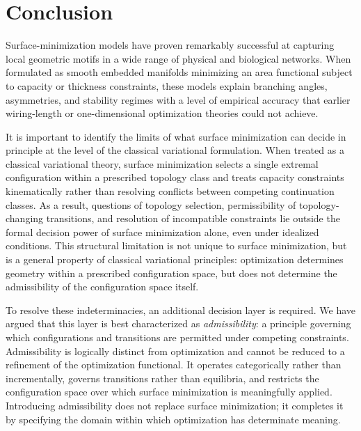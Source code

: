 \section{Conclusion}

Surface-minimization models have proven remarkably successful at capturing local geometric motifs in a wide range of physical and biological networks. When formulated as smooth embedded manifolds minimizing an area functional subject to capacity or thickness constraints, these models explain branching angles, asymmetries, and stability regimes with a level of empirical accuracy that earlier wiring-length or one-dimensional optimization theories could not achieve.\cite{Meng2026SurfaceOptimization}

It is important to identify the limits of what surface minimization can decide in principle at the level of the classical variational formulation. When treated as a classical variational theory, surface minimization selects a single extremal configuration within a prescribed topology class and treats capacity constraints kinematically rather than resolving conflicts between competing continuation classes. As a result, questions of topology selection, permissibility of topology-changing transitions, and resolution of incompatible constraints lie outside the formal decision power of surface minimization alone, even under idealized conditions. This structural limitation is not unique to surface minimization, but is a general property of classical variational principles: optimization determines geometry within a prescribed configuration space, but does not determine the admissibility of the configuration space itself.

To resolve these indeterminacies, an additional decision layer is required. We have argued that this layer is best characterized as \emph{admissibility}: a principle governing which configurations and transitions are permitted under competing constraints. Admissibility is logically distinct from optimization and cannot be reduced to a refinement of the optimization functional. It operates categorically rather than incrementally, governs transitions rather than equilibria, and restricts the configuration space over which surface minimization is meaningfully applied. Introducing admissibility does not replace surface minimization; it completes it by specifying the domain within which optimization has determinate meaning.

